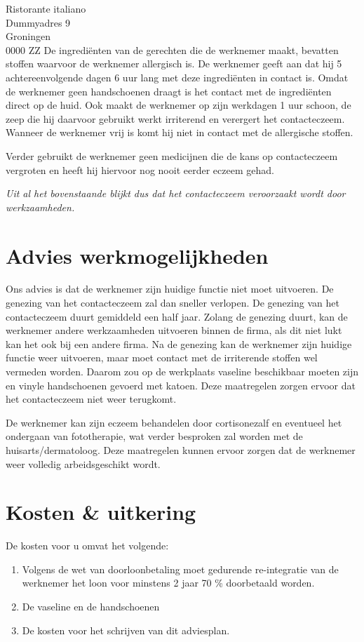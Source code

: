 \documentclass[foldmarks=true,foldmarks=blmtP,fromphone,
fromemail,fromlogo,version=last,sections]{scrlttr2}
\begin{document}
\begin{letter}{%
	Ristorante italiano\\
	Dummyadres 9\\
	Groningen\\
	0000 ZZ%
}
De ingrediënten van de gerechten die de werknemer maakt, bevatten stoffen waarvoor de werknemer allergisch is. De werknemer geeft aan dat hij 5 achtereenvolgende dagen 6 uur lang met deze ingrediënten in contact is. Omdat de werknemer geen handschoenen draagt is het contact met de ingrediënten direct op de huid. Ook maakt de werknemer op zijn werkdagen 1 uur schoon, de zeep die hij daarvoor gebruikt werkt irriterend en verergert het contacteczeem. Wanneer de werknemer vrij is komt hij niet in contact met de allergische stoffen. 

Verder gebruikt de werknemer geen medicijnen die de kans op contacteczeem vergroten en heeft hij hiervoor nog nooit eerder eczeem gehad. 

\emph{Uit al het bovenstaande blijkt dus dat het contacteczeem veroorzaakt wordt door werkzaamheden.}

\section{Advies werkmogelijkheden}
Ons advies is dat de werknemer zijn huidige functie niet moet uitvoeren. De genezing van het contacteczeem zal dan sneller verlopen. De genezing van het contacteczeem duurt gemiddeld een half jaar. Zolang de genezing duurt, kan de werknemer andere werkzaamheden uitvoeren binnen de firma, als dit niet lukt kan het ook bij een andere firma. Na de genezing kan de werknemer zijn huidige functie weer uitvoeren, maar moet contact met de irriterende stoffen wel vermeden worden. Daarom zou op de werkplaats vaseline beschikbaar moeten zijn en vinyle handschoenen gevoerd met katoen. Deze maatregelen zorgen ervoor dat het contacteczeem niet weer terugkomt. 

De werknemer kan zijn eczeem behandelen door cortisonezalf en eventueel het ondergaan van fototherapie, wat verder besproken zal worden met de huisarts/dermatoloog. Deze maatregelen kunnen ervoor zorgen dat de werknemer weer volledig arbeidsgeschikt wordt. 
\section{Kosten \& uitkering}
De kosten voor u omvat het volgende:
\begin{enumerate}
    \item Volgens de wet van doorloonbetaling moet gedurende re-integratie van de werknemer het loon voor minstens 2 jaar 70 \% doorbetaald worden.
    \item De vaseline en de handschoenen
    \item De kosten voor het schrijven van dit adviesplan.
\end{enumerate}


\end{letter}
\end{document}
